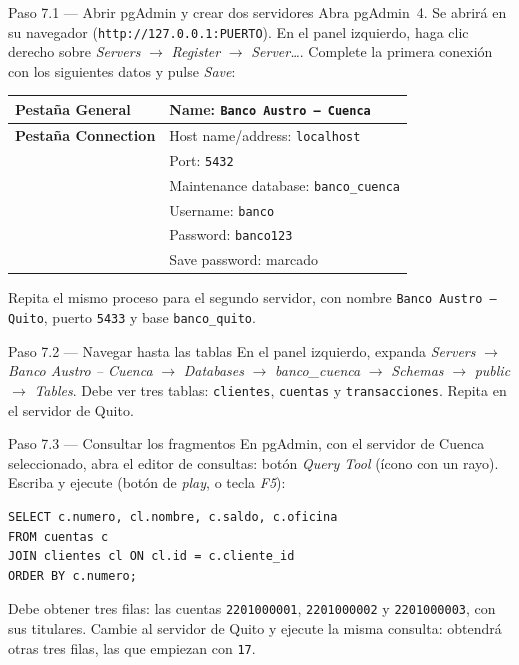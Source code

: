 \documentclass[11pt,a4paper]{article}
\begin{document}
\begin{pasobox}{Paso 7.1 --- Abrir pgAdmin y crear dos servidores}
Abra pgAdmin~4. Se abrir\'a en su navegador (\texttt{http://127.0.0.1:PUERTO}). En el panel izquierdo, haga clic derecho sobre \emph{Servers} $\rightarrow$ \emph{Register} $\rightarrow$ \emph{Server\ldots}. Complete la primera conexi\'on con los siguientes datos y pulse \emph{Save}:

\begin{xltabular}{\textwidth}{@{}p{4cm}X@{}}
\toprule
\textbf{Pesta\~na General}  & Name: \texttt{Banco Austro -- Cuenca} \\
\midrule
\textbf{Pesta\~na Connection} & Host name/address: \texttt{localhost} \\
                            & Port: \texttt{5432} \\
                            & Maintenance database: \texttt{banco\_cuenca} \\
                            & Username: \texttt{banco} \\
                            & Password: \texttt{banco123} \\
                            & Save password: marcado \\
\bottomrule
\end{xltabular}

Repita el mismo proceso para el segundo servidor, con nombre \texttt{Banco Austro -- Quito}, puerto \texttt{5433} y base \texttt{banco\_quito}.
\end{pasobox}

\begin{pasobox}{Paso 7.2 --- Navegar hasta las tablas}
En el panel izquierdo, expanda \emph{Servers} $\rightarrow$ \emph{Banco Austro -- Cuenca} $\rightarrow$ \emph{Databases} $\rightarrow$ \emph{banco\_cuenca} $\rightarrow$ \emph{Schemas} $\rightarrow$ \emph{public} $\rightarrow$ \emph{Tables}. Debe ver tres tablas: \texttt{clientes}, \texttt{cuentas} y \texttt{transacciones}. Repita en el servidor de Quito.
\end{pasobox}

\begin{pasobox}{Paso 7.3 --- Consultar los fragmentos}
En pgAdmin, con el servidor de Cuenca seleccionado, abra el editor de consultas: bot\'on \emph{Query Tool} (\'icono con un rayo). Escriba y ejecute (bot\'on de \emph{play}, o tecla \emph{F5}):

\begin{lstlisting}[style=sqlstyle]
SELECT c.numero, cl.nombre, c.saldo, c.oficina
FROM cuentas c
JOIN clientes cl ON cl.id = c.cliente_id
ORDER BY c.numero;
\end{lstlisting}

Debe obtener tres filas: las cuentas \texttt{2201000001}, \texttt{2201000002} y \texttt{2201000003}, con sus titulares. Cambie al servidor de Quito y ejecute la misma consulta: obtendr\'a otras tres filas, las que empiezan con \texttt{17}.
\end{pasobox}
\end{document}
